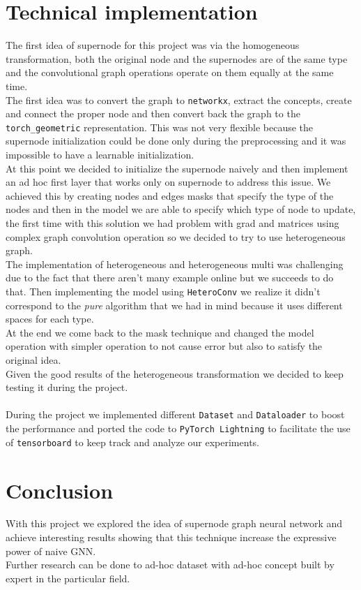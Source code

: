 \documentclass[twoside,11pt]{article}
\begin{document}

\section{Technical implementation}
The first idea of supernode for this project was via the homogeneous transformation, both the original node and the supernodes are of the same type and the convolutional graph operations operate on them equally at the same time.\\ The first idea was to convert the graph to \texttt{networkx}, extract the concepts, create and connect the proper node and then convert back the graph to the \texttt{torch\_geometric} representation. This was not very flexible because the supernode initialization could be done only during the preprocessing and it was impossible to have a learnable initialization.\\
At this point we decided to initialize the supernode naively and then implement an ad hoc first layer that works only on supernode to address this issue. We achieved this by creating nodes and edges masks that specify the type of the nodes and then in the model we are able to specify which type of node to update, the first time with this solution we had problem with grad and matrices using complex graph convolution operation so we decided to try to use heterogeneous graph.\\
The implementation of heterogeneous and heterogeneous multi was challenging due to the fact that there aren't many example online but we succeeds to do that.
Then implementing the model using \texttt{HeteroConv} we realize it didn't correspond to the \textit{pure} algorithm that we had in mind because it uses different spaces for each type.\\
At the end we come back to the mask technique and changed the model operation with simpler operation to not cause error but also to satisfy the original idea.\\
Given the good results of the heterogeneous transformation we decided to keep testing it during the project.\\\\
During the project we implemented different \texttt{Dataset} and \texttt{Dataloader} to boost the performance and ported the code to \texttt{PyTorch Lightning} to facilitate the use of \texttt{tensorboard} to keep track and analyze our experiments.

\section{Conclusion}
With this project we explored the idea of supernode graph neural network and achieve interesting results showing that this technique increase the expressive power of naive GNN.\\
Further research can be done to ad-hoc dataset with ad-hoc concept built by expert in the particular field.
\end{document}
